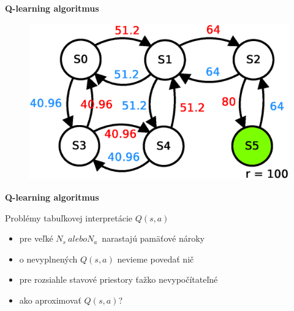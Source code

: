 \documentclass[xcolor=dvipsnames]{beamer}
\begin{document}
\begin{frame}{\bf Q-learning algoritmus}

\begin{figure}[!htb]
\includegraphics[scale=.5]{../diagrams/q_learning_table_06.eps}
\end{figure}

\end{frame}


\begin{frame}{\bf Q-learning algoritmus}

Problémy tabuľkovej interpretácie $Q(s, a)$

\begin{itemize}
\item pre veľké ${N_s}\  alebo  {N_a}$\ narastajú pamäťové nároky
\item o nevyplnených $Q(s, a)$ nevieme povedať nič
\item pre rozsiahle stavové priestory ťažko nevypočítateľné
\item ako aproximovať $Q(s, a)$?
\end{itemize}

\end{frame}
\end{document}
